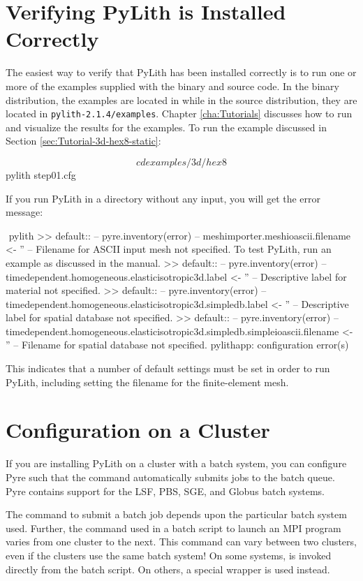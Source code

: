 \section{Verifying PyLith is Installed Correctly}

The easiest way to verify that PyLith has been installed correctly is
to run one or more of the examples supplied with the binary and source
code. In the binary distribution, the examples are located in
 while in the source distribution,
they are located in \texttt{pylith-2.1.4/examples}. Chapter
\vref{cha:Tutorials} discusses how to run and visualize the results
for the examples. To run the example discussed in Section
\vref{sec:Tutorial-3d-hex8-static}:
\begin{shell}
$$ cd examples/3d/hex8
$$ pylith step01.cfg
\end{shell}
If you run PyLith in a directory without any input, you will get the
error message:
\begin{shell}
$$ pylith
 >> {default}::
 -- pyre.inventory(error)
 -- meshimporter.meshioascii.filename <- ''
 -- Filename for ASCII input mesh not specified.
    To test PyLith, run an example as discussed in the manual.
 >> {default}::
 -- pyre.inventory(error)
 -- timedependent.homogeneous.elasticisotropic3d.label <- ''
 -- Descriptive label for material not specified.
 >> {default}::
 -- pyre.inventory(error)
 -- timedependent.homogeneous.elasticisotropic3d.simpledb.label <- ''
 -- Descriptive label for spatial database not specified.
 >> {default}::
 -- pyre.inventory(error)
 -- timedependent.homogeneous.elasticisotropic3d.simpledb.simpleioascii.filename <- ''
 -- Filename for spatial database not specified.
pylithapp: configuration error(s)
\end{shell}
This indicates that a number of default settings must be set in order
to run PyLith, including setting the filename for the finite-element
mesh.


\section{Configuration on a Cluster}

If you are installing PyLith on a cluster with a batch system, you can
configure Pyre such that the  command automatically
submits jobs to the batch queue. Pyre contains support for the LSF,
PBS, SGE, and Globus batch systems.

The command to submit a batch job depends upon the particular batch
system used. Further, the command used in a batch script to launch an
MPI program varies from one cluster to the next. This command can vary
between two clusters, even if the clusters use the same batch system!
On some systems,  is invoked directly from the batch
script. On others, a special wrapper is used instead.

